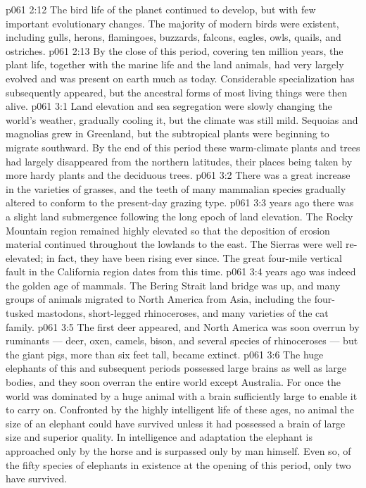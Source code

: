 \vs p061 2:12 The bird life of the planet continued to develop, but with few important evolutionary changes. The majority of modern birds were existent, including gulls, herons, flamingoes, buzzards, falcons, eagles, owls, quails, and ostriches.
\vs p061 2:13 \pc By the close of this  period, covering ten million years, the plant life, together with the marine life and the land animals, had very largely evolved and was present on earth much as today. Considerable specialization has subsequently appeared, but the ancestral forms of most living things were then alive.
\vs p061 3:1 Land elevation and sea segregation were slowly changing the world’s weather, gradually cooling it, but the climate was still mild. Sequoias and magnolias grew in Greenland, but the subtropical plants were beginning to migrate southward. By the end of this period these warm\hyp{}climate plants and trees had largely disappeared from the northern latitudes, their places being taken by more hardy plants and the deciduous trees.
\vs p061 3:2 There was a great increase in the varieties of grasses, and the teeth of many mammalian species gradually altered to conform to the present\hyp{}day grazing type.
\vs p061 3:3 \pc {} years ago there was a slight land submergence following the long epoch of land elevation. The Rocky Mountain region remained highly elevated so that the deposition of erosion material continued throughout the lowlands to the east. The Sierras were well re\hyp{}elevated; in fact, they have been rising ever since. The great four\hyp{}mile vertical fault in the California region dates from this time.
\vs p061 3:4 \pc {} years ago was indeed the golden age of mammals. The Bering Strait land bridge was up, and many groups of animals migrated to North America from Asia, including the four\hyp{}tusked mastodons, short\hyp{}legged rhinoceroses, and many varieties of the cat family.
\vs p061 3:5 The first deer appeared, and North America was soon overrun by ruminants --- deer, oxen, camels, bison, and several species of rhinoceroses --- but the giant pigs, more than six feet tall, became extinct.
\vs p061 3:6 The huge elephants of this and subsequent periods possessed large brains as well as large bodies, and they soon overran the entire world except Australia. For once the world was dominated by a huge animal with a brain sufficiently large to enable it to carry on. Confronted by the highly intelligent life of these ages, no animal the size of an elephant could have survived unless it had possessed a brain of large size and superior quality. In intelligence and adaptation the elephant is approached only by the horse and is surpassed only by man himself. Even so, of the fifty species of elephants in existence at the opening of this period, only two have survived.
